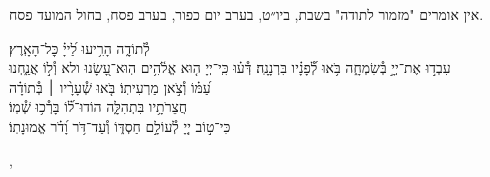 \documentclass[twoside, openany, parskip=half, 11pt]{book}
\begin{document}
\begin{narrow}
\begin{scriptsize} %
\textsf{
אין אומרים "מזמור לתודה" בשבת, ביו״ט, בערב יום כפור, בערב פסח, בחול המועד פסח.\\
}\end{scriptsize}
 לְ֯תוֹדָ֑ה \hfill
הָרִ֥יעוּ לַ֝ייָ֗ כׇּל־הָאָֽרֶץ׃\\
עִבְד֣וּ אֶת־יְיָ֣ בְּ֯שִׂמְחָ֑ה \hfill בֹּ֥אוּ לְ֯֝פָנָ֗יו בִּרְנָנָֽה׃
דְּ֯ע֗וּ כִּֽי־יְיָ ה֤וּא אֱלֹ֫הִ֥ים \hfill הֽוּא־עָ֭שָׂנוּ ולא וְ֯ל֣וֹ אֲנַ֑חְנוּ\\ עַ֝מּ֗וֹ וְ֯צֹ֣אן מַרְעִיתֽוֹ׃ \hfill
בֹּ֤אוּ שְׁ֯עָרָ֨יו ׀ בְּ֯תוֹדָ֗ה \\ חֲצֵרֹתָ֥יו בִּתְהִלָּ֑ה \hfill הוֹדוּ־ל֗֝וֹ בָּרְ֯כ֥וּ שְׁ֯מֽוֹ׃\\
כִּי־ט֣וֹב יְיָ֭ לְ֯עוֹלָ֣ם חַסְדּ֑וֹ \hfill וְ֯עַד־דֹּ֥ר וָ֝דֹ֗ר אֱמוּנָתֽוֹ׃
\end{narrow}
,
\end{document}
